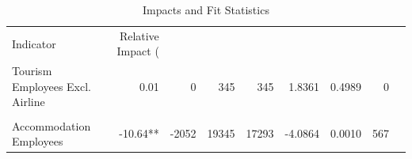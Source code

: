\begin{table}[!h]
\centering
\caption{Impacts and Fit Statistics}
\centering
\begin{tabular}[t]{lrrrrrrr}
\toprule
Indicator & Relative Impact (%
\midrule
{} &  &  &  &  &  &  & \\
Tourism Employees Excl. Airline & 0.01 & 0 & 345 & 345 & 1.8361 & 0.4989 & 0\\
 &  &  &  &  &  &  & \\
Accommodation Employees & -10.64** & -2052 & 19345 & 17293 & -4.0864 & 0.0010 & 567\\
\bottomrule
\end{tabular}
\end{table}
